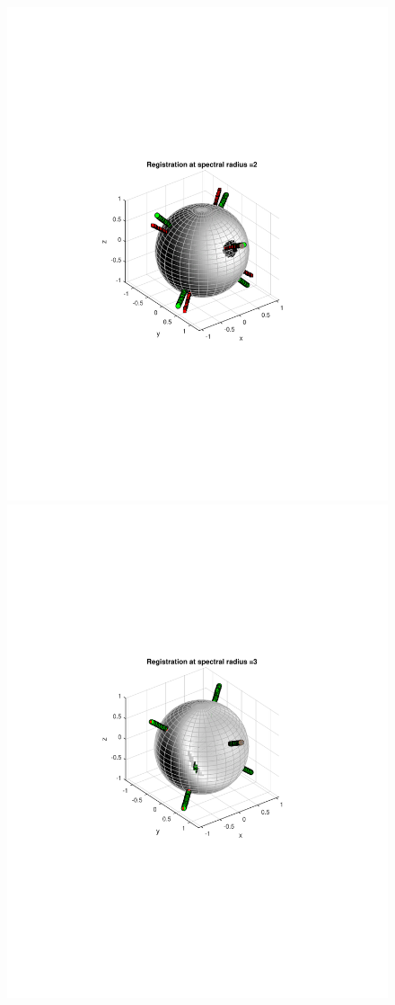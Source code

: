 \documentclass{UCF_ETD}
\begin{document}
\begin{figure}[H]
\begin{center}
\includegraphics[scale=0.45]{RobustRegistration/SphericalImageWrapped2Rotated}
\includegraphics[scale=0.45]{RobustRegistration/SphericalImageWrapped3Rotated}

\end{center}
\end{figure}
\end{document}
